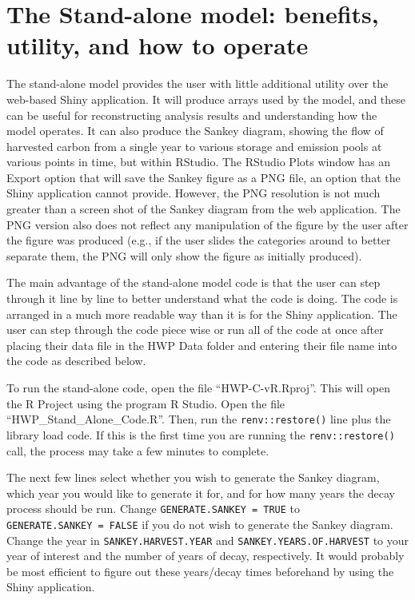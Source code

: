 \documentclass[
  openany]{book}
\begin{document}
\hypertarget{dnld-sa}{%
\section{The Stand-alone model: benefits, utility, and how to operate}\label{dnld-sa}}

The stand-alone model provides the user with little additional utility over the web-based Shiny application. It will produce arrays used by the model, and these can be useful for reconstructing analysis results and understanding how the model operates. It can also produce the Sankey diagram, showing the flow of harvested carbon from a single year to various storage and emission pools at various points in time, but within RStudio. The RStudio Plots window has an Export option that will save the Sankey figure as a PNG file, an option that the Shiny application cannot provide. However, the PNG resolution is not much greater than a screen shot of the Sankey diagram from the web application. The PNG version also does not reflect any manipulation of the figure by the user after the figure was produced (e.g., if the user slides the categories around to better separate them, the PNG will only show the figure as initially produced).

The main advantage of the stand-alone model code is that the user can step through it line by line to better understand what the code is doing. The code is arranged in a much more readable way than it is for the Shiny application. The user can step through the code piece wise or run all of the code at once after placing their data file in the HWP Data folder and entering their file name into the code as described below.

To run the stand-alone code, open the file ``HWP-C-vR.Rproj''. This will open the R Project using the program R Studio. Open the file ``HWP\_Stand\_Alone\_Code.R''. Then, run the \texttt{renv::restore()} line plus the library load code. If this is the first time you are running the \texttt{renv::restore()} call, the process may take a few minutes to complete.

The next few lines select whether you wish to generate the Sankey diagram, which year you would like to generate it for, and for how many years the decay process should be run. Change \texttt{GENERATE.SANKEY\ =\ TRUE} to \texttt{GENERATE.SANKEY\ =\ FALSE} if you do not wish to generate the Sankey diagram. Change the year in \texttt{SANKEY.HARVEST.YEAR} and \texttt{SANKEY.YEARS.OF.HARVEST} to your year of interest and the number of years of decay, respectively. It would probably be most efficient to figure out these years/decay times beforehand by using the Shiny application.
\end{document}
